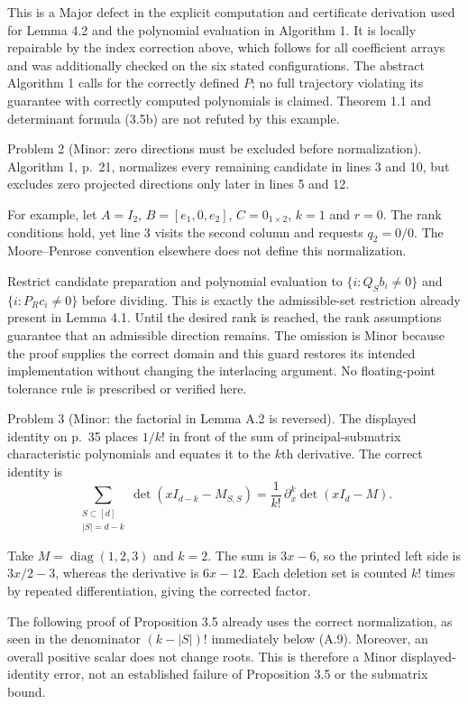\documentclass[10pt]{article}
\begin{document}
This is a Major defect in the explicit computation and certificate derivation used for Lemma 4.2 and the polynomial evaluation in Algorithm 1. It is locally repairable by the index correction above, which follows for all coefficient arrays and was additionally checked on the six stated configurations. The abstract Algorithm 1 calls for the correctly defined \(P\); no full trajectory violating its guarantee with correctly computed polynomials is claimed. Theorem 1.1 and determinant formula (3.5b) are not refuted by this example.\par
Problem 2 (Minor: zero directions must be excluded before normalization).  Algorithm 1, p. 21, normalizes every remaining candidate in lines 3 and 10, but excludes zero projected directions only later in lines 5 and 12.\par
For example, let \(A=I_2\), \(B=[e_1,0,e_2]\), \(C=0_{1\times2}\), \(k=1\) and \(r=0\). The rank conditions hold, yet line 3 visits the second column and requests \(q_2=0/0\). The Moore–Penrose convention elsewhere does not define this normalization.\par
Restrict candidate preparation and polynomial evaluation to \(\{i:Q_Sb_i\neq0\}\) and \(\{i:P_Rc_i\neq0\}\) before dividing. This is exactly the admissible-set restriction already present in Lemma 4.1. Until the desired rank is reached, the rank assumptions guarantee that an admissible direction remains. The omission is Minor because the proof supplies the correct domain and this guard restores its intended implementation without changing the interlacing argument. No floating-point tolerance rule is prescribed or verified here.\par
Problem 3 (Minor: the factorial in Lemma A.2 is reversed).  The displayed identity on p. 35 places \(1/k!\) in front of the sum of principal-submatrix characteristic polynomials and equates it to the \(k\)th derivative. The correct identity is \[\sum_{\substack{S\subset[d]\\|S|=d-k}}
 \det(xI_{d-k}-M_{S,S})
 =\frac1{k!}\,\partial_x^k\det(xI_d-M).\]\par
Take \(M=\operatorname{diag}(1,2,3)\) and \(k=2\). The sum is \(3x-6\), so the printed left side is \(3x/2-3\), whereas the derivative is \(6x-12\). Each deletion set is counted \(k!\) times by repeated differentiation, giving the corrected factor.\par
The following proof of Proposition 3.5 already uses the correct normalization, as seen in the denominator \((k-|S|)!\) immediately below (A.9). Moreover, an overall positive scalar does not change roots. This is therefore a Minor displayed-identity error, not an established failure of Proposition 3.5 or the submatrix bound.\par
\end{document}
